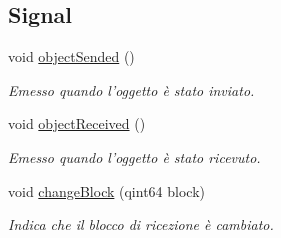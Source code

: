 \subsection*{Signal}
\begin{DoxyCompactItemize}
\item 
\hypertarget{class_k_cloud_1_1_net_object_aaddbaffdc58a8f17bfa8a288c15cac10}{void \hyperlink{class_k_cloud_1_1_net_object_aaddbaffdc58a8f17bfa8a288c15cac10}{object\-Sended} ()}\label{class_k_cloud_1_1_net_object_aaddbaffdc58a8f17bfa8a288c15cac10}

\begin{DoxyCompactList}\small\item\em Emesso quando l'oggetto è stato inviato. \end{DoxyCompactList}\item 
\hypertarget{class_k_cloud_1_1_net_object_a6d044dc4b9a791cd7e84ccd4c8bb1ca3}{void \hyperlink{class_k_cloud_1_1_net_object_a6d044dc4b9a791cd7e84ccd4c8bb1ca3}{object\-Received} ()}\label{class_k_cloud_1_1_net_object_a6d044dc4b9a791cd7e84ccd4c8bb1ca3}

\begin{DoxyCompactList}\small\item\em Emesso quando l'oggetto è stato ricevuto. \end{DoxyCompactList}\item 
void \hyperlink{class_k_cloud_1_1_net_object_a50b8a5b3160e005b8d3bf8f0df43cf49}{change\-Block} (qint64 block)
\begin{DoxyCompactList}\small\item\em Indica che il blocco di ricezione è cambiato. \end{DoxyCompactList}\end{DoxyCompactItemize}
